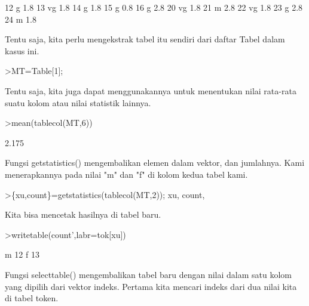\documentclass[a4paper,10pt]{article}
\begin{document}
\begin{eulernotebook}
\begin{eulercomment}
\begin{eulercomment}
\begin{euleroutput}
          12          g       1.8
          13         vg       1.8
          14          g       1.8
          15          g       0.8
          16          g       2.8
          20         vg       1.8
          21          m       2.8
          22         vg       1.8
          23          g       2.8
          24          m       1.8
\end{euleroutput}
\begin{eulercomment}
Tentu saja, kita perlu mengekstrak tabel itu sendiri dari daftar Tabel
dalam kasus ini.
\end{eulercomment}
\begin{eulerprompt}
>MT=Table[1];
\end{eulerprompt}
\begin{eulercomment}
Tentu saja, kita juga dapat menggunakannya untuk menentukan nilai
rata-rata suatu kolom atau nilai statistik lainnya.
\end{eulercomment}
\begin{eulerprompt}
>mean(tablecol(MT,6))
\end{eulerprompt}
\begin{euleroutput}
  2.175
\end{euleroutput}
\begin{eulercomment}
Fungsi getstatistics() mengembalikan elemen dalam vektor, dan
jumlahnya. Kami menerapkannya pada nilai "m" dan "f" di kolom kedua
tabel kami.
\end{eulercomment}
\begin{eulerprompt}
>\{xu,count\}=getstatistics(tablecol(MT,2)); xu, count,
\end{eulerprompt}
\begin{euleroutput}
  [1,  3]
  [12,  13]
\end{euleroutput}
\begin{eulercomment}
Kita bisa mencetak hasilnya di tabel baru.
\end{eulercomment}
\begin{eulerprompt}
>writetable(count',labr=tok[xu])
\end{eulerprompt}
\begin{euleroutput}
           m        12
           f        13
\end{euleroutput}
\begin{eulercomment}
Fungsi selecttable() mengembalikan tabel baru dengan nilai dalam satu
kolom yang dipilih dari vektor indeks. Pertama kita mencari indeks
dari dua nilai kita di tabel token.
\end{eulercomment}
\begin{eulerprompt}

\end{eulerprompt}
\end{eulercomment}
\end{eulercomment}
\end{eulernotebook}
\end{document}
